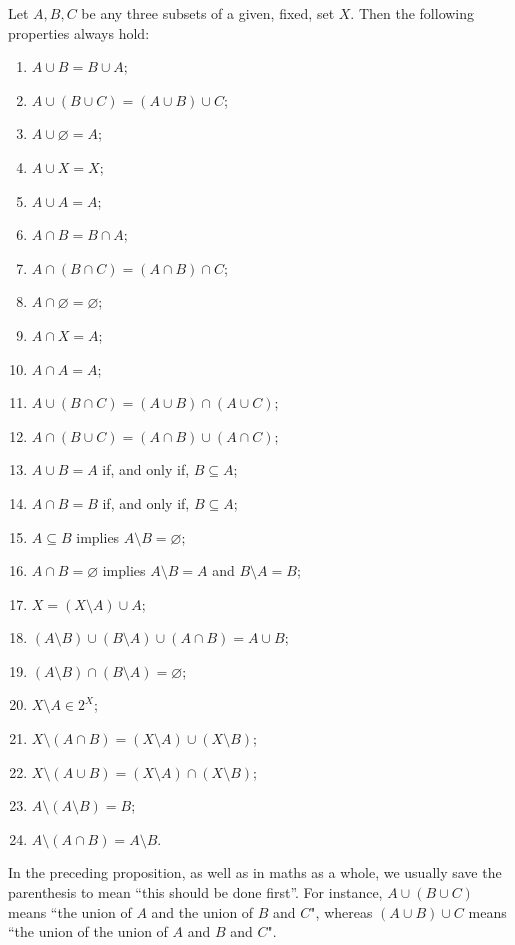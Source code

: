 \begin{prop}\label{prop:union intersection difference properties}
	Let $A,B,C$ be any three subsets of a given, fixed, set $X$. Then the following properties always hold:
	\begin{multicols}{2}
		\begin{enumerate}[(1)]
			\item $A\cup B=B\cup A$;
			\item $A\cup(B\cup C)=(A\cup B)\cup C$;
			\item $A\cup\varnothing = A$;
			\item $A\cup X=X$;
			\item $A\cup A=A$;
			\item $A\cap B=B\cap A$;
			\item $A\cap(B\cap C)=(A\cap B)\cap C$;
			\item $A\cap\varnothing=\varnothing$;
			\item $A\cap X=A$;
			\item $A\cap A=A$;
			\item $A\cup(B\cap C)=(A\cup B)\cap(A\cup C)$;
			\item $A\cap(B\cup C)=(A\cap B)\cup(A\cap C)$;
			\item $A\cup B=A$ if, and only if, $B\subseteq A$;
			\item $A\cap B=B$ if, and only if, $B\subseteq A$;
			\item $A\subseteq B$ implies $A\setminus B=\varnothing$;
			\item $A\cap B=\varnothing$ implies $A\setminus B=A$ and $B\setminus A=B$;
			\item $X=(X\setminus A)\cup A$;
			\item $(A\setminus B)\cup(B\setminus A)\cup(A\cap B)=A\cup B$;		
			\item $(A\setminus B)\cap(B\setminus A)=\varnothing$;
			\item $X\setminus A\in 2^X$;
			\item $X\setminus (A\cap B)=(X\setminus A)\cup(X\setminus B)$;
			\item $X\setminus (A\cup B)=(X\setminus A)\cap(X\setminus B)$;			
			\item $A\setminus(A\setminus B)=B$;
			\item $A\setminus(A\cap B)=A\setminus B$.
		\end{enumerate}%
	\end{multicols}%
\end{prop}

\begin{rmk}
	In the preceding proposition, as well as in maths as a whole, we usually save the parenthesis to mean ``this should be done first''. For instance, $A\cup(B\cup C)$ means ``the union of $A$ and the union of $B$ and $C$", whereas $(A\cup B)\cup C$ means ``the union of the union of $A$ and $B$ and $C$".
\end{rmk}
\newpage
